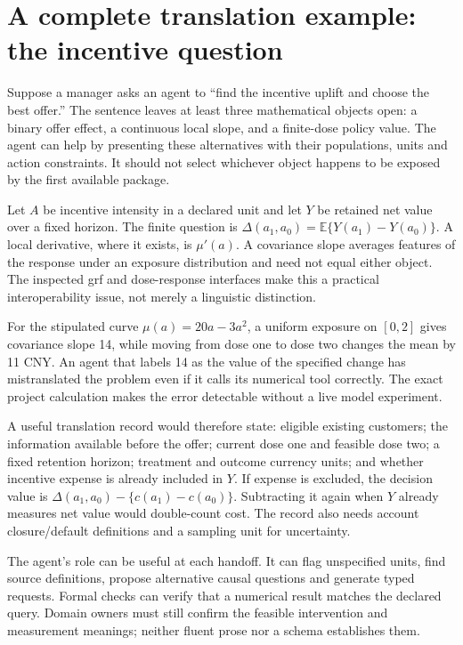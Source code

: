 \section{A complete translation example: the incentive question}
\label{v13:la-dose}

Suppose a manager asks an agent to ``find the incentive uplift and choose the
best offer.'' The sentence leaves at least three mathematical objects open:
a binary offer effect, a continuous local slope, and a finite-dose policy value.
The agent can help by presenting these alternatives with their populations,
units and action constraints. It should not select whichever object happens
to be exposed by the first available package.

Let $A$ be incentive intensity in a declared unit and let $Y$ be retained net
value over a fixed horizon. The finite question is
$\Delta(a_1,a_0)=\mathbb E\{Y(a_1)-Y(a_0)\}$. A local derivative, where it
exists, is $\mu'(a)$. A covariance slope averages features of the response
under an exposure distribution and need not equal either object. The inspected
grf and dose-response interfaces make this a practical interoperability issue,
not merely a linguistic distinction. \citep{v13_sw_grf,v13_sw_causaldrf}

For the stipulated curve $\mu(a)=20a-3a^2$, a uniform exposure on $[0,2]$
gives covariance slope 14, while moving from dose one to dose two changes the
mean by 11 CNY. An agent that labels 14 as the value of the specified change
has mistranslated the problem even if it calls its numerical tool correctly.
The exact project calculation makes the error detectable without a live model
experiment. \citep{v13_project_exact}

A useful translation record would therefore state: eligible existing customers;
the information available before the offer; current dose one and feasible dose
two; a fixed retention horizon; treatment and outcome currency units; and
whether incentive expense is already included in $Y$. If expense is excluded,
the decision value is $\Delta(a_1,a_0)-\{c(a_1)-c(a_0)\}$. Subtracting it again
when $Y$ already measures net value would double-count cost. The record also
needs account closure/default definitions and a sampling unit for uncertainty.

The agent's role can be useful at each handoff. It can flag unspecified units,
find source definitions, propose alternative causal questions and generate
typed requests. Formal checks can verify that a numerical result matches the
declared query. Domain owners must still confirm the feasible intervention and
measurement meanings; neither fluent prose nor a schema establishes them.

